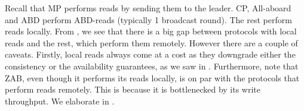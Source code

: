 Recall that MP performs reads by sending them to the leader. CP, All-aboard and ABD perform ABD-reads (typically 1 broadcast round). The rest perform reads locally.
From , we see that there is a big gap between protocols with local reads and the rest, which perform them remotely. However there are a couple of caveats.
Firstly, local reads always come at a cost as they downgrade either the consistency or the availability guarantees, as we saw in .
Furthermore, note that ZAB, even though it performs its reads locally, is on par with the protocols that perform reads remotely.
This is because it is bottlenecked by its write throughput.
We elaborate in .


